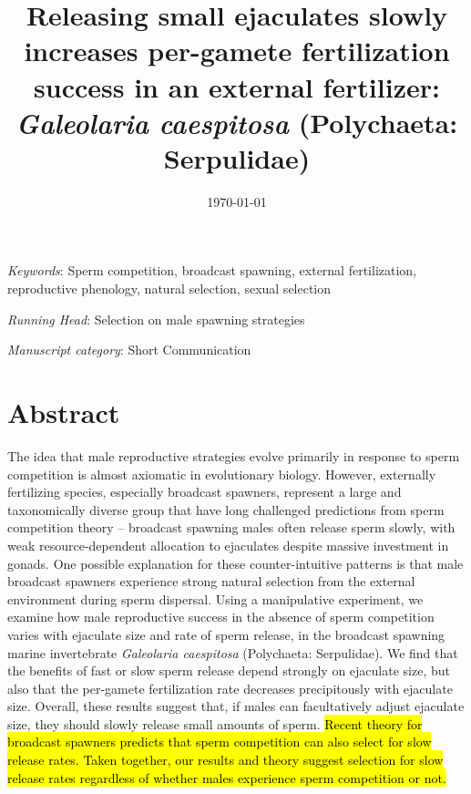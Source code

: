 \documentclass{article}
\title{Releasing small ejaculates slowly increases per-gamete fertilization success in an external fertilizer: \textit{Galeolaria caespitosa} (Polychaeta: Serpulidae)}
\date{\today}
\begin{document}
\maketitle




\noindent{} \textit{Keywords}: Sperm competition, broadcast spawning, external fertilization, reproductive phenology, natural selection, sexual selection
\bigskip

\noindent{} \textit{Running Head}: Selection on male spawning strategies

\bigskip

\noindent{} \textit{Manuscript category}: Short Communication

\bigskip


\linenumbers
\modulolinenumbers[1]
\renewcommand\linenumberfont{\normalfont\small}
\newpage{}



\section{Abstract}

\noindent{} The idea that male reproductive strategies evolve primarily in response to sperm competition is almost axiomatic in evolutionary biology. However, externally fertilizing species, especially broadcast spawners, represent a large and taxonomically diverse group that have long challenged predictions from sperm competition theory -- broadcast spawning males often release sperm slowly, with weak resource-dependent allocation to ejaculates despite massive investment in gonads. One possible explanation for these counter-intuitive patterns is that male broadcast spawners experience strong natural selection from the external environment during sperm dispersal. Using a manipulative experiment, we examine how male reproductive success in the absence of sperm competition varies with ejaculate size and rate of sperm release, in the broadcast spawning marine invertebrate \textit{Galeolaria caespitosa} (Polychaeta: Serpulidae). We find that the benefits of fast or slow sperm release depend strongly on ejaculate size, but also that the per-gamete fertilization rate decreases precipitously with ejaculate size. Overall, these results suggest that, if males can facultatively adjust ejaculate size, they should slowly release small amounts of sperm. \hl{Recent theory for broadcast spawners predicts that sperm competition can also select for slow release rates. Taken together, our results and theory suggest selection for slow release rates regardless of whether males experience sperm competition or not.}
\end{document}
